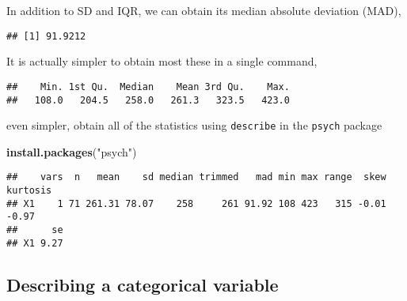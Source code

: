 \documentclass[]{book}
\newenvironment{Shaded}{\begin{snugshade}}{\end{snugshade}}
\newcommand{\KeywordTok}[1]{\textcolor[rgb]{0.13,0.29,0.53}{\textbf{{#1}}}}
\newcommand{\StringTok}[1]{\textcolor[rgb]{0.31,0.60,0.02}{{#1}}}
\newcommand{\NormalTok}[1]{{#1}}
\theoremstyle{definition}
\theoremstyle{definition}
\theoremstyle{remark}
\begin{document}
In addition to SD and IQR, we can obtain its median absolute deviation
(MAD),

\begin{Shaded}
\end{Shaded}

\begin{verbatim}
## [1] 91.9212
\end{verbatim}

It is actually simpler to obtain most these in a single command,

\begin{Shaded}
\end{Shaded}

\begin{verbatim}
##    Min. 1st Qu.  Median    Mean 3rd Qu.    Max. 
##   108.0   204.5   258.0   261.3   323.5   423.0
\end{verbatim}

even simpler, obtain all of the statistics using \texttt{describe} in
the \texttt{psych} package

\begin{Shaded}
\begin{Highlighting}[]
\KeywordTok{install.packages}\NormalTok{(}\StringTok{"psych"}\NormalTok{)}
\end{Highlighting}
\end{Shaded}

\begin{Shaded}
\end{Shaded}

\begin{verbatim}
##    vars  n   mean    sd median trimmed   mad min max range  skew kurtosis
## X1    1 71 261.31 78.07    258     261 91.92 108 423   315 -0.01    -0.97
##      se
## X1 9.27
\end{verbatim}

\subsection{Describing a categorical
variable}\label{describing-a-categorical-variable}
\end{document}

